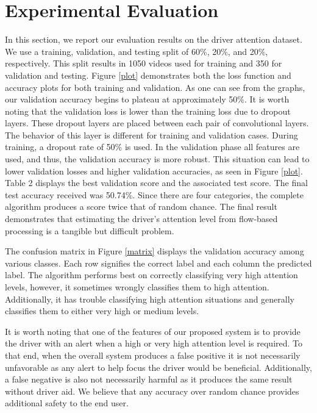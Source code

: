 \documentclass[10pt, conference, compsocconf]{IEEEtran}
\begin{document}
\section{Experimental Evaluation}
In this section, we report our evaluation results on the driver attention dataset. We use a training, validation, and testing split of 60\%, 20\%, and 20\%, respectively. This split results in 1050 videos used for training and 350 for validation and testing. Figure \ref{plot} demonstrates both the loss function and accuracy plots for both training and validation. As one can see from the graphs, our validation accuracy begins to plateau at approximately 50\%. It is worth noting that the validation loss is lower than the training loss due to dropout layers. These dropout layers are placed between each pair of convolutional layers. The behavior of this layer is different for training and validation cases. During training, a dropout rate of 50\% is used. In the validation phase all features are used, and thus, the validation accuracy is more robust. This situation can lead to lower validation losses and higher validation accuracies, as seen in Figure \ref{plot}. Table 2 displays the best validation score and the associated test score. The final test accuracy received was 50.74\%. Since there are four categories, the complete algorithm produces a score twice that of random chance. The final result demonstrates that estimating the driver's attention level from flow-based processing is a tangible but difficult problem. 

The confusion matrix in Figure \ref{matrix} displays the validation accuracy among various classes. Each row signifies the correct label and each column the predicted label. The algorithm performs best on correctly classifying very high attention levels, however, it sometimes wrongly classifies them to high attention. Additionally, it has trouble classifying high attention situations and generally classifies them to either very high or medium levels.

It is worth noting that one of the features of our proposed system is to provide the driver with an alert when a high or very high attention level is required. To that end, when the overall system produces a false positive it is not necessarily unfavorable as any alert to help focus the driver would be beneficial. Additionally, a false negative is also not necessarily harmful as it produces the same result without driver aid. We believe that any accuracy over random chance provides additional safety to the end user.
\end{document}
